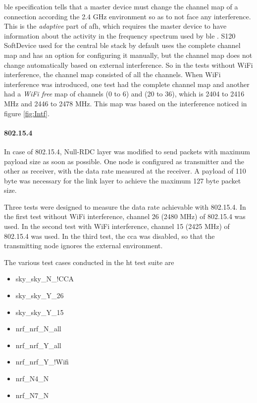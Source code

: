 \gls{ble}  specification tells that a master device must change the channel map of a connection according the 2.4 GHz environment so as to not face any interference. This is the \emph{adaptive} part of \gls{afh}, which requires the master device to have information about the activity in the frequency spectrum used by \gls{ble} . S120 SoftDevice used for the central \gls{ble}  stack by default uses the complete channel map and has an option for configuring it manually, but the channel map does not change automatically based on external interference. So in the tests without WiFi interference, the channel map consisted of all the channels. When WiFi interference was introduced, one test had the complete channel map and another had a \emph{WiFi free} map of channels (0 to 6) and (20 to 36), which is 2404 to 2416 MHz and 2446 to 2478 MHz. This map was based on the interference noticed in figure \ref{fig:Intf}.

\paragraph{802.15.4} In case of 802.15.4, Null-RDC layer was modified to send packets with maximum payload size as soon as possible. One node is configured as transmitter and the other as receiver, with the data rate measured at the receiver. A payload of 110 byte was necessary for the link layer to achieve the maximum 127 byte packet size.

Three tests were designed to measure the data rate achievable with 802.15.4. In the first test without WiFi interference, channel 26 (2480 MHz) of 802.15.4 was used. In the second test with WiFi interference, channel 15 (2425 MHz) of 802.15.4 was used. In the third test, the \gls{cca} was disabled, so that the transmitting node ignores the external environment.

The various test cases conducted in the \gls{ht} test suite are 
\vspace{-5 pt}
\begin{multicols}{2}
\begin{itemize} \itemsep1pt \parskip0pt 
\item sky\_sky\_N\_!CCA
\item sky\_sky\_Y\_26
\item sky\_sky\_Y\_15
\item nrf\_nrf\_N\_all
\item nrf\_nrf\_Y\_all
\item nrf\_nrf\_Y\_!Wifi
\item nrf\_N4\_N
\item nrf\_N7\_N
\end{itemize}
\end{multicols}


